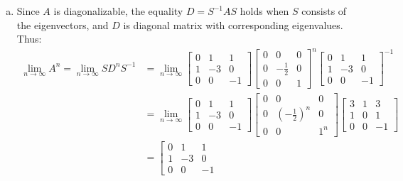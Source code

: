 \documentclass[12pt, letterpaper]{scrartcl}
\begin{document}
\begin{enumerate}[(a)]
     \item 
     Since $A$ is diagonalizable, the equality $D=S^{-1}AS$ holds when $S$ consists of the eigenvectors, and $D$ is diagonal matrix with corresponding eigenvalues. Thus:
     \begin{align*}
         \lim_{n\rightarrow\infty}A^n=\lim_{n\rightarrow\infty}SD^nS^{-1}&=
         \lim_{n\rightarrow\infty}\left[
         \begin{array}{ccc}
              0&1&1\\
              1&-3&0\\
              0&0&-1
         \end{array}
         \right]
         \left[
         \begin{array}{ccc}
              0&0&0\\
              0&-\frac{1}{2}&0\\
              0&0&1
         \end{array}
         \right]^n
         \left[
         \begin{array}{ccc}
              0&1&1\\
              1&-3&0\\
              0&0&-1
         \end{array}
         \right]^{-1}\\
         &=\lim_{n\rightarrow\infty}\left[
         \begin{array}{ccc}
              0&1&1\\
              1&-3&0\\
              0&0&-1
         \end{array}
         \right]
         \left[
         \begin{array}{ccc}
              0&0&0\\
              0&(-\frac{1}{2})^n&0\\
              0&0&1^n
         \end{array}
         \right]
         \left[
         \begin{array}{ccc}
              3&1&3\\
              1&0&1\\
              0&0&-1
         \end{array}
         \right]\\
         &=\left[
         \begin{array}{ccc}
              0&1&1\\
              1&-3&0\\
              0&0&-1

\end{array}
\end{align*}
\end{enumerate}
\end{document}
